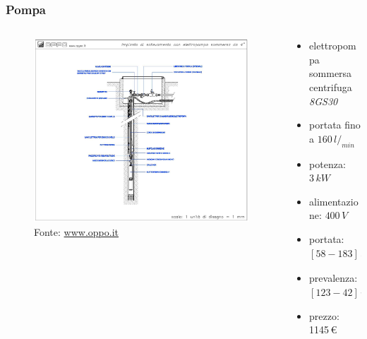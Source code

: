 \documentclass{beamer}
\begin{document}
\begin{frame}
 \frametitle{Pompa}
 \begin{columns}
  \begin{column}{.5\textwidth}
   \begin{figure}
    \centering
    \includegraphics[width=\linewidth]{images/impianto_pompaggio}
    \caption{Fonte: \url{www.oppo.it}}
   \end{figure}
  \end{column}
%
    \begin{column}{.5\textwidth}
     \begin{itemize}
      \item elettropompa sommersa centrifuga \emph{8GS30}
      \item portata fino a $160\,l/_{min}$
      \item potenza: $3\,kW$
      \item alimentazione: $400\,V$
      \item portata: $[58 - 183]\,l/_{min}$
      \item prevalenza: $[123 - 42]\,m$
      \item prezzo: 1145\,\euro
     \end{itemize}

    \end{column}

 \end{columns}

\end{frame}
\end{document}
